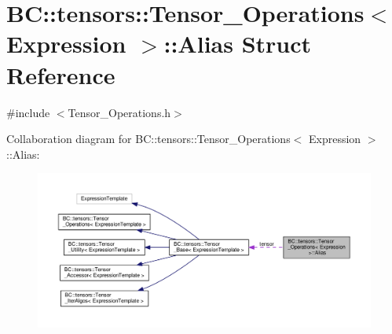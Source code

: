 \hypertarget{structBC_1_1tensors_1_1Tensor__Operations_1_1Alias}{}\section{BC\+:\+:tensors\+:\+:Tensor\+\_\+\+Operations$<$ Expression $>$\+:\+:Alias Struct Reference}
\label{structBC_1_1tensors_1_1Tensor__Operations_1_1Alias}


{\ttfamily \#include $<$Tensor\+\_\+\+Operations.\+h$>$}



Collaboration diagram for BC\+:\+:tensors\+:\+:Tensor\+\_\+\+Operations$<$ Expression $>$\+:\+:Alias\+:
\nopagebreak
\begin{figure}[H]
\begin{center}
\leavevmode
\includegraphics[width=350pt]{structBC_1_1tensors_1_1Tensor__Operations_1_1Alias__coll__graph}
\end{center}
\end{figure}
